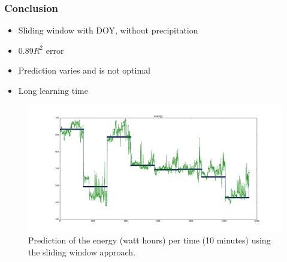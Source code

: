 \documentclass{beamer}
\begin{document}
\begin{frame}
\frametitle{Conclusion}


\begin{itemize}
\item Sliding window with DOY, without precipitation
\item $0.89 R^{2}$ error
\item Prediction varies and is not optimal
\item Long learning time
\end{itemize}

\begin{figure}[H]
  \includegraphics[width=0.8\linewidth]{img/predict-energy--0p890.png}
  \caption{Prediction of the energy (watt hours) per time (10 minutes) using the sliding window approach.}
  \label{fig:Prediction}
\end{figure}

\end{frame}











%


%
\end{document}
